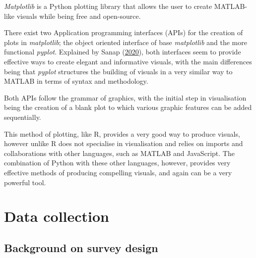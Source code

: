 \documentclass[
  11pt,
]{book}
\begin{document}
\textit{Matplotlib} is a Python plotting library that allows the user to
create MATLAB-like visuals while being free and open-source.

There exist two Application programming interfaces (APIs) for the
creation of plots in \textit{matplotlib}; the object oriented interface
of base \textit{matplotlib} and the more functional \textit{pyplot}.
Explained by Sanap (\protect\hyperlink{ref-matplotblog}{2020}), both
interfaces seem to provide effective ways to create elegant and
informative visuals, with the main differences being that
\textit{pyplot} structures the building of visuals in a very similar way
to MATLAB in terms of syntax and methodology.

Both APIs follow the grammar of graphics, with the initial step in
visualisation being the creation of a blank plot to which various
graphic features can be added sequentially.

This method of plotting, like R, provides a very good way to produce
visuals, however unlike R does not specialise in visualisation and
relies on imports and collaborations with other languages, such as
MATLAB and JavaScript. The combination of Python with these other
languages, however, provides very effective methods of producing
compelling visuals, and again can be a very powerful tool.

\chapter{Data collection}

\section{Background on survey design}
\end{document}
